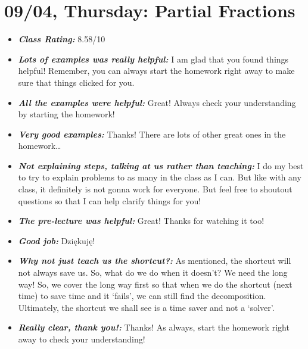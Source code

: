 \documentclass[11pt,letterpaper]{article}
\begin{document}
\newpage
\section*{09/04, Thursday: Partial Fractions\label{09-04}}

\begin{itemize}
\item {\bfseries\itshape Class Rating:} 8.58/10

\item {\bfseries\itshape Lots of examples was really helpful:} I am glad that you found things helpful! Remember, you can always start the homework right away to make sure that things clicked for you. 

\item {\bfseries\itshape All the examples were helpful:} Great! Always check your understanding by starting the homework!

\item {\bfseries\itshape Very good examples:} Thanks! There are lots of other great ones in the homework\dots \Winkey

\item {\bfseries\itshape Not explaining steps, talking at us rather than teaching:} I do my best to try to explain problems to as many in the class as I can. But like with any class, it definitely is not gonna work for everyone. But feel free to shoutout questions so that I can help clarify things for you!

\item {\bfseries\itshape The pre-lecture was helpful:} Great! Thanks for watching it too!

\item {\bfseries\itshape Good job:} Dziękuję!

\item {\bfseries\itshape Why not just teach us the shortcut?:} As mentioned, the shortcut will not always save us. So, what do we do when it doesn't? We need the long way! So, we cover the long way first so that when we do the shortcut (next time) to save time and it `fails', we can still find the decomposition. Ultimately, the shortcut we shall see is a time saver and not a `solver'. 

\item {\bfseries\itshape Really clear, thank you!:} Thanks! As always, start the homework right away to check your understanding!


\end{itemize}
\end{document}
